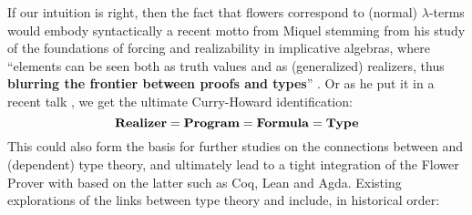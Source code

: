 If our intuition is right, then the fact that flowers correspond to (normal)
$\lambda$-terms would embody syntactically a recent motto from Miquel stemming
from his study of the foundations of forcing and realizability in implicative
algebras, where ``elements can be seen both as truth values and as (generalized)
realizers, thus \textbf{blurring the frontier between proofs and
types}'' . Or as he put it in a
recent talk \cite{miquel_implicative_topos_2022}, we get the ultimate
Curry-Howard identification:
$$
\text{\textbf{Realizer}} = \text{\textbf{Program}} = \text{\textbf{Formula}} = \text{\textbf{Type}}
$$
This could also form the basis for further studies on the connections between 
and (dependent) type theory, and ultimately lead to a tight integration of the
Flower Prover with  based on the latter such as Coq, Lean and
Agda. Existing explorations of the links between type theory and 
include, in historical order:

